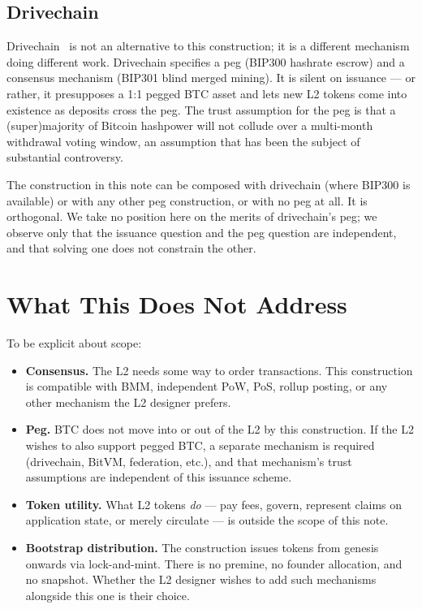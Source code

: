 \documentclass[11pt,a4paper]{article}
\begin{document}
\subsection{Drivechain}

Drivechain~\cite{bip300,bip301} is not an alternative to this construction; it is a different mechanism doing different work. Drivechain specifies a peg (BIP300 hashrate escrow) and a consensus mechanism (BIP301 blind merged mining). It is silent on issuance --- or rather, it presupposes a 1:1 pegged BTC asset and lets new L2 tokens come into existence as deposits cross the peg. The trust assumption for the peg is that a (super)majority of Bitcoin hashpower will not collude over a multi-month withdrawal voting window, an assumption that has been the subject of substantial controversy.

The construction in this note can be composed with drivechain (where BIP300 is available) or with any other peg construction, or with no peg at all. It is orthogonal. We take no position here on the merits of drivechain's peg; we observe only that the issuance question and the peg question are independent, and that solving one does not constrain the other.

\section{What This Does Not Address}

To be explicit about scope:

\begin{itemize}[leftmargin=*]
  \item \textbf{Consensus.} The L2 needs some way to order transactions. This construction is compatible with BMM, independent PoW, PoS, rollup posting, or any other mechanism the L2 designer prefers.
  \item \textbf{Peg.} BTC does not move into or out of the L2 by this construction. If the L2 wishes to also support pegged BTC, a separate mechanism is required (drivechain, BitVM, federation, etc.), and that mechanism's trust assumptions are independent of this issuance scheme.
  \item \textbf{Token utility.} What L2 tokens \emph{do} --- pay fees, govern, represent claims on application state, or merely circulate --- is outside the scope of this note.
  \item \textbf{Bootstrap distribution.} The construction issues tokens from genesis onwards via lock-and-mint. There is no premine, no founder allocation, and no snapshot. Whether the L2 designer wishes to add such mechanisms alongside this one is their choice.
\end{itemize}
\end{document}
